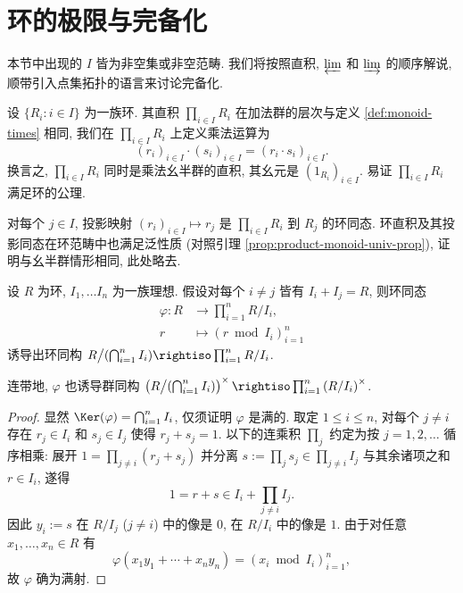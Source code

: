 \section{环的极限与完备化}\label{sec:ring-limits}
本节中出现的 $I$ 皆为非空集或非空范畴. 我们将按照直积, $\varprojlim$ 和 $\varinjlim$ 的顺序解说, 顺带引入点集拓扑的语言来讨论完备化.

\begin{definition}\label{def:ring-direct-product}
	设 $\{R_i : i \in I\}$ 为一族环. 其直积 $\prod_{i \in I} R_i$ 在加法群的层次与定义 \ref{def:monoid-times} 相同, 我们在 $\prod_{i \in I} R_i$ 上定义乘法运算为
	\[ (r_i)_{i \in I} \cdot (s_i)_{i \in I} = (r_i \cdot s_i)_{i \in I}. \]
	换言之, $\prod_{i \in I} R_i$ 同时是乘法幺半群的直积, 其幺元是 $(1_{R_i})_{i \in I}$. 易证 $\prod_{i \in I} R_i$ 满足环的公理.
\end{definition}

对每个 $j \in I$, 投影映射 $(r_i)_{i \in I} \mapsto r_j$ 是 $\prod_{i \in I} R_i$ 到 $R_j$ 的环同态. 环直积及其投影同态在环范畴中也满足泛性质 (对照引理 \ref{prop:product-monoid-univ-prop}), 证明与幺半群情形相同, 此处略去.

\begin{theorem}[中国剩余定理]\label{prop:CRT}
	设 $R$ 为环, $I_1, \ldots I_n$ 为一族理想. 假设对每个 $i \neq j$ 皆有 $I_i + I_j = R$, 则环同态
	\begin{align*}
		\varphi: R & \longrightarrow \prod_{i=1}^n R/I_i, \\
		r & \longmapsto \left( r \bmod I_i \right)_{i=1}^n
	\end{align*}
	诱导出环同构 $R \big/ (\bigcap_{i=1}^n I_i) \rightiso \prod_{i=1}^n R/I_i$.
\end{theorem}
连带地, $\varphi$ 也诱导群同构 $\left( R \big/ (\bigcap_{i=1}^n I_i)\right)^\times \rightiso \prod_{i=1}^n \left(R/I_i\right)^\times$.
\begin{proof}
	显然 $\Ker(\varphi) = \bigcap_{i=1}^n I_i$, 仅须证明 $\varphi$ 是满的. 取定 $1 \leq i \leq n$, 对每个 $j \neq i$ 存在 $r_j \in I_i$ 和 $s_j \in I_j$ 使得 $r_j + s_j = 1$. 以下的连乘积 $\prod_j$ 约定为按 $j=1,2,\ldots$ 循序相乘: 展开 $1 = \prod_{j \neq i} (r_j + s_j)$ 并分离 $s := \prod_j s_j \in \prod_{j \neq i} I_j$ 与其余诸项之和 $r \in I_i$, 遂得
	\[ 1 = r + s \in I_i + \prod_{j \neq i} I_j. \]
	因此 $y_i := s$ 在 $R/I_j$ ($j \neq i$) 中的像是 $0$, 在 $R/I_i$ 中的像是 $1$. 由于对任意 $x_1, \ldots, x_n \in R$ 有
	\[ \varphi(x_1 y_1 + \cdots + x_n y_n) = (x_i \bmod I_i)_{i=1}^n, \]
	故 $\varphi$ 确为满射.
\end{proof}

